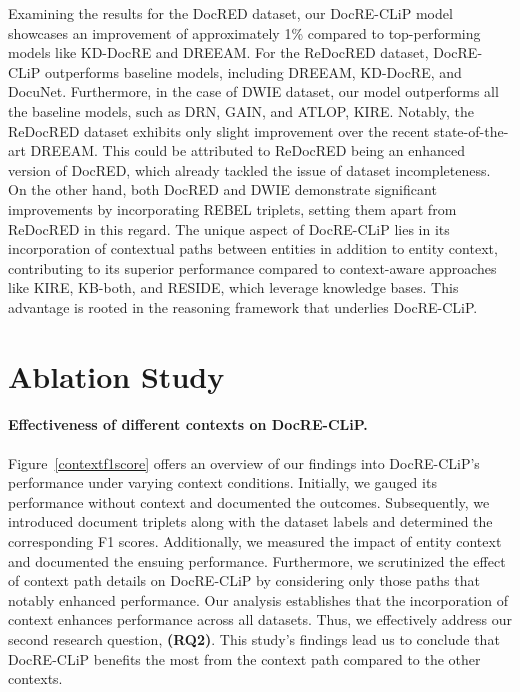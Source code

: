 \documentclass[letterpaper]{article} %
\begin{document}
Examining the results for the DocRED dataset, our DocRE-CLiP model showcases an improvement of approximately 1\% compared to top-performing models like KD-DocRE and DREEAM. For the ReDocRED dataset, DocRE-CLiP outperforms baseline models, including DREEAM, KD-DocRE, and DocuNet. Furthermore, in the case of DWIE dataset, our model outperforms all the baseline models, such as DRN, GAIN, and ATLOP, KIRE. Notably, the ReDocRED dataset exhibits only slight improvement over the recent state-of-the-art DREEAM. This could be attributed to ReDocRED being an enhanced version of DocRED, which already tackled the issue of dataset incompleteness. On the other hand, both DocRED and DWIE demonstrate significant improvements by incorporating REBEL triplets, setting them apart from ReDocRED in this regard.
The unique aspect of DocRE-CLiP lies in its incorporation of contextual paths between entities in addition to entity context, contributing to its superior performance compared to context-aware approaches like KIRE, KB-both, and RESIDE, which leverage knowledge bases. This advantage is rooted in the reasoning framework that underlies DocRE-CLiP.








\section{Ablation Study}

\paragraph{\textbf{Effectiveness of different contexts on DocRE-CLiP.}} Figure~\ref{contextf1score} offers an overview of our findings into DocRE-CLiP's performance under varying context conditions. Initially, we gauged its performance without context and documented the outcomes. Subsequently, we introduced document triplets along with the dataset labels and determined the corresponding F1 scores. Additionally, we measured the impact of entity context and documented the ensuing performance. Furthermore, we scrutinized the effect of context path details on DocRE-CLiP by considering only those paths that notably enhanced performance. Our analysis establishes that the incorporation of context enhances performance across all datasets. Thus, we effectively address our second research question, \textbf{(RQ2)}.
This study's findings lead us to conclude that DocRE-CLiP benefits the most from the context path compared to the other contexts.
\end{document}
